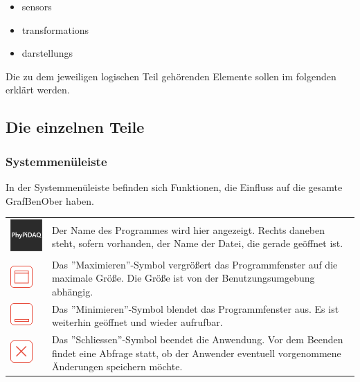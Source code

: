 \documentclass[parskip=full]{scrartcl}
\begin{document}
\begin{itemize}
	\item \glspl{sensor}
	\item \glspl{transformation}
	\item \glspl{darstellung}
\end{itemize}

Die zu dem jeweiligen logischen Teil gehörenden Elemente sollen im folgenden erklärt werden.

\subsection{Die einzelnen Teile}

\subsubsection{Systemmenüleiste}
In der Systemmenüleiste befinden sich Funktionen, die Einfluss auf die gesamte \gls{GrafBenOber} haben.

\begin{tabular}[t]{p{1cm} p{10cm}} %
	\vspace{0cm}\includegraphics[width = 1 cm]{Grafik/PhyPiDAQ.png} & Der Name des Programmes wird hier angezeigt. Rechts daneben steht, sofern vorhanden, der Name der Datei, die gerade geöffnet ist.\newline\\
	\vspace{0cm}\includegraphics[width = 1 cm]{Grafik/Maximieren.png} & Das ''Maximieren''-Symbol vergrößert das Programmfenster auf die maximale Größe. Die Größe ist von der Benutzungsumgebung abhängig.\newline\\
	\vspace{0cm}\includegraphics[width = 1 cm]{Grafik/Minimieren.png} & Das ''Minimieren''-Symbol blendet das Programmfenster aus. Es ist weiterhin geöffnet und wieder aufrufbar. \\
	\vspace{0cm}\includegraphics[width = 1 cm]{Grafik/Schliessen.png} & Das ''Schliessen''-Symbol beendet die Anwendung. Vor dem Beenden findet eine Abfrage statt, ob der Anwender eventuell vorgenommene Änderungen speichern möchte.\\
\end{tabular}
\end{document}

